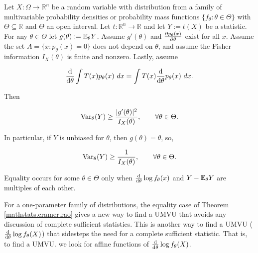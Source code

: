 \begin{theorem}\label{mathstats.cramer.rao} Let \(X: \Omega \to \mathbb{R}^n\) be a random variable with distribution from a family of multivariable probability densities or probability mass functions \(\{f_\theta: \theta \in \Theta\}\) with \(\Theta \subseteq \mathbb{R}\) and \(\Theta\) an open interval. Let \(t: \mathbb{R}^n \to \mathbb{R}\) and let \(Y:= t(X)\) be a statistic. For any \(\theta \in \Theta\) let \(g(\theta) := \E_\theta Y\). Assume \(g'(\theta)\) and \( \pderiv{p_\theta(x)}{\theta}\) exist for all \(x\). Assume the set \(A = \{x: p_\theta(x) = 0\}\) does not depend on \(\theta\), and assume the Fisher information \(I_X(\theta)\) is finite and nonzero. Lastly, assume

\[
\deriv{}{\theta} \int T(x) p_\theta(x) \ dx = \int T(x) \deriv{}{\theta} p_\theta(x) \ dx.
\]

Then

\[
\Var_\theta(Y) \geq \frac{ |g'(\theta)|^2}{I_X(\theta)}, \qquad \forall \theta \in \Theta.
\]

In particular, if \(Y\) is unbiased for \(\theta\), then \(g(\theta) = \theta\), so,

\[
\Var_\theta(Y) \geq \frac{ 1}{I_X(\theta)}, \qquad \forall \theta \in \Theta.
\]

Equality occurs for some \(\theta \in \Theta\) only when \(\deriv{}{\theta} \log f_\theta(x) \) and \(Y - \E_\theta Y\) are multiples of each other. 

\end{theorem}

\begin{remark}For a one-parameter family of distributions, the equality case of Theorem \ref{mathstats.cramer.rao} gives a new way to find a UMVU that avoids any discussion of complete sufficient statistics. This is another way to find a UMVU (\(\deriv{}{\theta}  \log f_\theta (X) \)) that sidesteps the need for a complete sufficient statistic. That is, to find a UMVU. we look for affine functions of \(\deriv{}{\theta}  \log f_\theta (X) \).

\end{remark}

